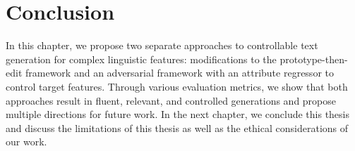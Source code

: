 \section{Conclusion}
\label{sec:ctrl_conclusion}

In this chapter, we propose two separate approaches to controllable text generation for complex linguistic features: modifications to the prototype-then-edit framework \citep{guu2018generating} and an adversarial framework with an attribute regressor to control target features. Through various evaluation metrics, we show that both approaches result in fluent, relevant, and controlled generations and propose multiple directions for future work. In the next chapter, we conclude this thesis and discuss the limitations of this thesis as well as the ethical considerations of our work.